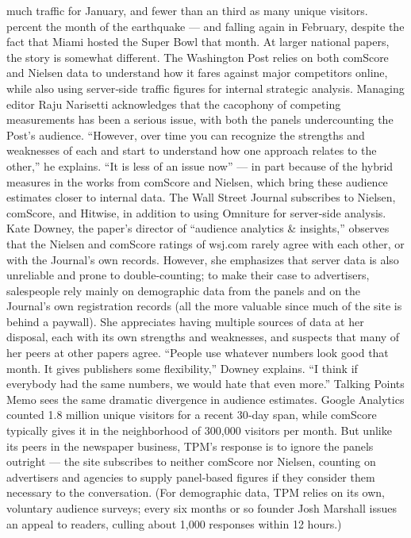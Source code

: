 much traffic for January, and fewer than an third as many unique visitors.
percent the month of the earthquake — and falling again in February,
despite the fact that Miami hosted the Super Bowl that month.
At larger national papers, the story is somewhat different. The Washington
Post relies on both comScore and Nielsen data to understand how it fares
against major competitors online, while also using server‐side traffic
figures for internal strategic analysis. Managing editor Raju Narisetti
acknowledges that the cacophony of competing measurements has been a
serious issue, with both the panels undercounting the Post’s audience.
``However, over time you can recognize the strengths and weaknesses of
each and start to understand how one approach relates to the other,'' he
explains. ``It is less of an issue now'' — in part because of the hybrid
measures in the works from comScore and Nielsen, which bring these
audience estimates closer to internal data.
The Wall Street Journal subscribes to Nielsen, comScore, and Hitwise, in
addition to using Omniture for server‐side analysis. Kate Downey, the
paper’s director of ``audience analytics & insights,'' observes that the
Nielsen and comScore ratings of wsj.com rarely agree with each other, or
with the Journal’s own records. However, she emphasizes that server data
is also unreliable and prone to double‐counting; to make their case to
advertisers, salespeople rely mainly on demographic data from the panels
and on the Journal’s own registration records (all the more valuable since
much of the site is behind a paywall). She appreciates having multiple
sources of data at her disposal, each with its own strengths and
weaknesses, and suspects that many of her peers at other papers agree.
``People use whatever numbers look good that month. It gives publishers
some flexibility,'' Downey explains. ``I think if everybody had the same
numbers, we would hate that even more.''
Talking Points Memo sees the same dramatic divergence in audience
estimates. Google Analytics counted 1.8 million unique visitors for a
recent 30‐day span, while comScore typically gives it in the neighborhood
of 300,000 visitors per month. But unlike its peers in the newspaper
business, TPM’s response is to ignore the panels outright — the site
subscribes to neither comScore nor Nielsen, counting on advertisers and
agencies to supply panel‐based figures if they consider them necessary to
the conversation. (For demographic data, TPM relies on its own, voluntary
audience surveys; every six months or so founder Josh Marshall issues an
appeal to readers, culling about 1,000 responses within 12 hours.)
